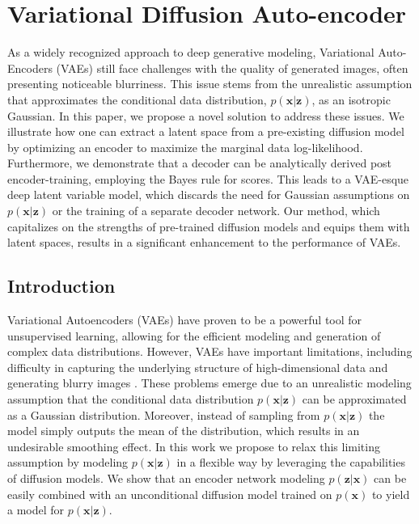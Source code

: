 \chapter{Variational Diffusion Auto-encoder}

\ifpdf
    \graphicspath{{Chapter3/Figs/Raster/}{Chapter3/Figs/PDF/}{Chapter3/Figs/}}
\else
    \graphicspath{{Chapter3/Figs/Vector/}{Chapter3/Figs/}}
\fi

As a widely recognized approach to deep generative modeling, Variational Auto-Encoders (VAEs) still face challenges with the quality of generated images, often presenting noticeable blurriness. This issue stems from the unrealistic assumption that approximates the conditional data distribution, $p(\textbf{x} | \textbf{z})$, as an isotropic Gaussian. In this paper, we propose a novel solution to address these issues. We illustrate how one can extract a latent space from a pre-existing diffusion model by optimizing an encoder to maximize the marginal data log-likelihood. Furthermore, we demonstrate that a decoder can be analytically derived post encoder-training, employing the Bayes rule for scores. This leads to a VAE-esque deep latent variable model, which discards the need for Gaussian assumptions on $p(\textbf{x} | \textbf{z})$ or the training of a separate decoder network. Our method, which capitalizes on the strengths of pre-trained diffusion models and equips them with latent spaces, results in a significant enhancement to the performance of VAEs.

\section{Introduction}
Variational Autoencoders (VAEs) \cite{vae} have proven to be a powerful tool for unsupervised learning, allowing for the efficient modeling and generation of complex data distributions. However, VAEs have important limitations, including difficulty in capturing the underlying structure of high-dimensional data and generating blurry images \cite{zaho2017understanding_vaes}. These problems emerge due to an unrealistic modeling assumption that the conditional data distribution $p(\textbf{x}| \textbf{z})$ can be approximated as a Gaussian distribution. Moreover, instead of sampling from $p(\textbf{x}| \textbf{z})$ the model simply outputs the mean of the distribution, which results in an undesirable smoothing effect. In this work we propose to relax this limiting assumption by modeling $p(\textbf{x}| \textbf{z})$ in a flexible way by leveraging the capabilities of diffusion models. We show that an encoder network modeling $p( \textbf{z} | \textbf{x})$ can be easily combined with an unconditional diffusion model trained on $p(\textbf{x})$ to yield a model for $p(\textbf{x} | \textbf{z})$.

